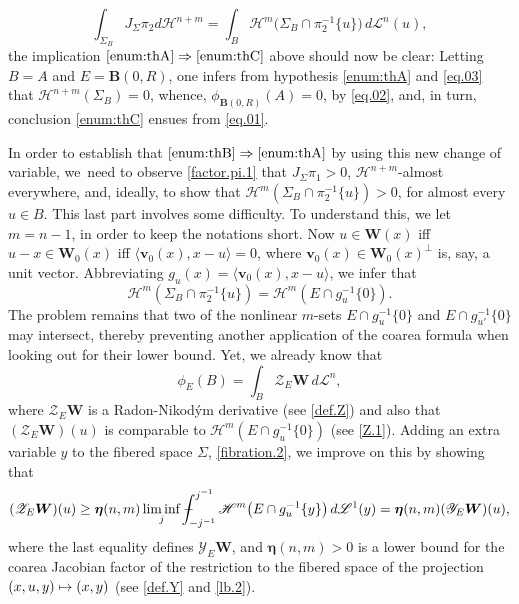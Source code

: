 \documentclass[JEP,XML,SOM,Unicode,ThmDefs,NoEqCountersInSection]{cedram}
\newcommand\mto{\mathchoice{\longmapsto}{\mapsto}{\mapsto}{\mapsto}}
\newcommand{\calH}{\mathscr{H}}
\newcommand{\calL}{\mathscr{L}}
\newcommand{\calY}{\mathscr{Y}}
\newcommand{\calZ}{\mathscr{Z}}
\newcommand{\boldeta}{\boldsymbol{\eta}}
\newcommand{\bB}{{\boldsymbol{B}}}
\newcommand{\bW}{{\boldsymbol{W}}}
\newcommand{\bv}{{\boldsymbol{v}}}
\def\Xint#1{\mathchoice
{\XXint\displaystyle\textstyle{#1}}{\XXint\textstyle\scriptstyle{#1}}{\XXint\scriptstyle\scriptscriptstyle{#1}}{\XXint\scriptscriptstyle
\scriptscriptstyle{#1}}\!\int}
\def\XXint#1#2#3{{\setbox0=\hbox{$#1{#2#3}{\int}$}
\vcenter{\hbox{$#2#3$}}\kern-.5\wd0}}
\def\dashint{\Xint-}
\let\la\langle
\let\ra\rangle
\begin{document}
\begin{equation}
\label{eq.03}
\int_{\Sigma_B} J_\Sigma \pi_2 d \calH^{n+m} = \int_B \calH^m \bigl(\Sigma_B \cap \pi_2^{-1}\{u\}\bigr)\,d\calL^n(u),
\end{equation}
the implication $\eqref{enum:thA} \Rightarrow \eqref{enum:thC}$ above should now be clear: Letting $B=A$ and $E=\bB(0,R)$, one infers from hypothesis \eqref{enum:thA} and \eqref{eq.03} that $\calH^{n+m}(\Sigma_B) = 0$, whence, $\phi_{\bB(0,R)}(A)=0$, by \eqref{eq.02}, and, in turn, conclusion \eqref{enum:thC} ensues from \eqref{eq.01}.
\par
In order to establish that $\eqref{enum:thB} \Rightarrow \eqref{enum:thA}$ by using this new change of variable, we~need to observe \ref{factor.pi.1} that $J_\Sigma \pi_1 > 0$, $\calH^{n+m}$-almost everywhere, and, ideally, to show that $\calH^m \left(\Sigma_B \cap \pi_2^{-1}\{u\}\right) > 0$, for almost every $u \in B$.
This last part involves some difficulty.
To understand this, we let $m=n-1$, in order to keep the notations short.
Now $u \in \bW(x)$ iff $u-x \in \bW_0(x)$ iff $\la \bv_0(x), x-u \ra =0$, where $\bv_0(x) \in \bW_0(x)^\perp$ is, say, a unit vector.
Abbreviating $g_u(x) = \la \bv_0(x), x-u \ra$, we infer that
\begin{equation*}
\calH^m(\Sigma_B \cap \pi_2^{-1}\{u\}) = \calH^m(E \cap g_u^{-1} \{0\}).
\end{equation*}
The problem remains that two of the nonlinear $m$-sets $E \cap g_u^{-1} \{0\}$ and $E \cap g_{u'}^{-1} \{0\}$ may intersect, thereby preventing another application of the coarea formula when looking out for their lower bound.
Yet, we already know that
\begin{equation*}
\phi_E(B) = \int_B \calZ_E \bW \,d\calL^n,
\end{equation*}
where $\calZ_E \bW$ is a Radon-Nikod\'ym derivative (see \ref{def.Z}) and also that $(\calZ_E \bW)(u)$ is comparable to $\calH^m \left(E \cap g_u^{-1} \{0\}\right)$ (see \ref{Z.1}).
Adding an extra variable $y$ to the fibered space $\Sigma$, \ref{fibration.2}, we improve on this by showing that
\begin{equation*}
(\calZ_E \bW)(u) \geq \boldeta(n,m) \liminf_j \dashint_{-j^{-1}}^{j^{-1}} \calH^m \bigl(E \cap g_u^{-1} \{y\}\bigr) \,d\calL^1(y) = \boldeta(n,m) (\calY_E \bW)(u),
\end{equation*}
where the last equality defines $\calY_E \bW$, and $\boldeta(n,m) > 0$ is a lower bound for the coarea Jacobian factor of the restriction to the fibered space of the projection $(x,u,y) \mto (x,y)$ (see \ref{def.Y} and \ref{lb.2}).
\end{document}
